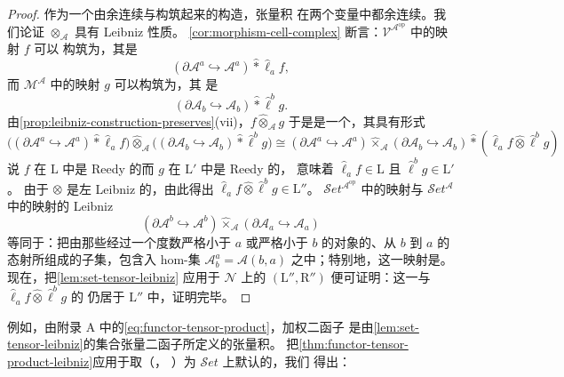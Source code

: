 \begin{proof}
作为一个由余连续\trFunctor{}与\trColimit{}构筑起来的构造，\trFunctor{}张量积
在两个变量中都余连续。我们论证 $\otimes_{\mathcal{A}}$ 具有 Leibniz 性质。
\cref{cor:morphism-cell-complex} 断言：$\mathcal{V}^{\mathcal{A}^{\mathrm{op}}}$ 中的映射 $f$ 可以
构筑为\trCellComplex，其\trCell{}是\trLeibnizProduct
\[
(\partial\mathcal{A}^{a}\hookrightarrow\mathcal{A}^{a})\mathbin{\widehat{\ast}}
\widehat{\ell}_{a}f,
\]
而 $\mathcal{M}^{\mathcal{A}}$ 中的映射 $g$ 可以构筑为\trCellComplex，其%
\trCell{}是\trLeibnizProduct
\[
(\partial\mathcal{A}_b\hookrightarrow\mathcal{A}_b)\mathbin{\widehat{\ast}}
\widehat{\ell}^{b}g.
\]
由\cref{prop:leibniz-construction-preserves}(vii)，$f\widehat{\otimes}_{\mathcal{A}}g$
于是是一个\trCellComplex，其\trCell{}具有形式
\[
\bigl((\partial\mathcal{A}^{a}\hookrightarrow\mathcal{A}^{a})\mathbin{\widehat{\ast}}
\widehat{\ell}_{a}f\bigr)\widehat{\otimes}_{\mathcal{A}}
\bigl((\partial\mathcal{A}_b\hookrightarrow\mathcal{A}_b)\mathbin{\widehat{\ast}}
\widehat{\ell}^{b}g\bigr)
\cong(\partial\mathcal{A}^{a}\hookrightarrow\mathcal{A}^{a})
\mathbin{\widehat{\times}}_{\mathcal{A}}(\partial\mathcal{A}_b\hookrightarrow
\mathcal{A}_b)\mathbin{\widehat{\ast}}(\widehat{\ell}_{a}f\widehat{\otimes}
\widehat{\ell}^{b}g)
\]
说 $f$ 在 $\mathrm{L}$ 中是 Reedy 的而 $g$ 在 $\mathrm{L}'$ 中是 Reedy 的，
意味着 $\widehat{\ell}_{a}f\in\mathrm{L}$ 且 $\widehat{\ell}^{b}g\in\mathrm{L}'$。
由于 $\otimes$ 是左 Leibniz 的，由此得出
$\widehat{\ell}_{a}f\widehat{\otimes}\widehat{\ell}^{b}g\in\mathrm{L}''$。
$\mathcal{S}et^{\mathcal{A}^{\mathrm{op}}}$ 中的映射与 $\mathcal{S}et^{\mathcal{A}}$
中的映射的 Leibniz \trFunctor{}\trTensorProduct
\[
(\partial\mathcal{A}^{b}\hookrightarrow\mathcal{A}^{b})
\mathbin{\widehat{\times}}_{\mathcal{A}}(\partial\mathcal{A}_a
\hookrightarrow\mathcal{A}_a)
\]
等同于：把由那些经过一个度数严格小于 $a$ 或严格小于 $b$ 的对象的、从 $b$ 到
$a$ 的态射所组成的子集，包含入 hom-集 $\mathcal{A}^{a}_{b}=\mathcal{A}(b,a)$
之中；特别地，这一映射是\trMonomorphism。现在，把\cref{lem:set-tensor-leibniz}
应用于 $\mathcal{N}$ 上的\trWeakFactorizationSystem{}
$(\mathrm{L}'',\mathrm{R}'')$ 便可证明：这一\trMonomorphism{}与
$\widehat{\ell}_{a}f\widehat{\otimes}\widehat{\ell}^{b}g$ 的%
\trLeibnizTensor{}仍居于 $\mathrm{L}''$ 中，证明完毕。
\end{proof}
例如，由附录 A 中的\eqref{eq:functor-tensor-product}，加权\trColimit{}二函子
是由\cref{lem:set-tensor-leibniz}的集合张量二函子所定义的\trFunctor{}张量积。
把\cref{thm:functor-tensor-product-leibniz}应用于取（\trMonomorphism，
\trEpimorphism）为 $\mathcal{S}et$ 上默认的\trWeakFactorizationSystem，我们
得出：

